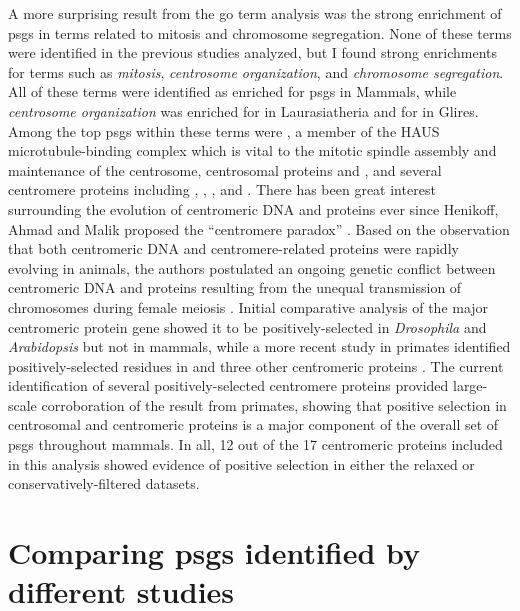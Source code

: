 A more surprising result from the \ac{go} term analysis was the strong
enrichment of \acp{psg} in terms related to mitosis and chromosome
segregation. None of these terms were identified in the previous
studies analyzed, but I found strong enrichments for terms such as
\emph{mitosis}, \emph{centrosome organization}, and \emph{chromosome
  segregation}. All of these terms were identified as enriched for
\psgeone \acp{psg} in Mammals, while \emph{centrosome organization}
was enriched for \psgeone in Laurasiatheria and for \psgefive in
Glires. Among the top \acp{psg} within these terms were ,
a member of the HAUS microtubule-binding complex which is vital to the
mitotic spindle assembly and maintenance of the centrosome,
centrosomal proteins  and , and several
centromere proteins including , ,
, and . There has been great interest
surrounding the evolution of centromeric DNA and proteins ever since
Henikoff, Ahmad and Malik proposed the ``centromere paradox''
\citeyearpar{Henikoff2001}. Based on the observation that both
centromeric DNA and centromere-related proteins were rapidly evolving
in animals, the authors postulated an ongoing genetic conflict between
centromeric DNA and proteins resulting from the unequal transmission
of chromosomes during female meiosis
\citep{Henikoff2001,Malik2002,Malik2009}. Initial comparative analysis
of the major centromeric protein  gene showed it to be
positively-selected in \emph{Drosophila} and \emph{Arabidopsis} but
not in mammals, while a more recent study in primates identified
positively-selected residues in  and three other
centromeric proteins \citep{Schueler2010}. The current identification
of several positively-selected centromere proteins provided
large-scale corroboration of the result from primates, showing that
positive selection in centrosomal and centromeric proteins is a major
component of the overall set of \acp{psg} throughout mammals. In all,
12 out of the 17 centromeric proteins included in this analysis showed
evidence of positive selection in either the relaxed or
conservatively-filtered datasets.

\section{Comparing \acp{psg} identified by different studies}

